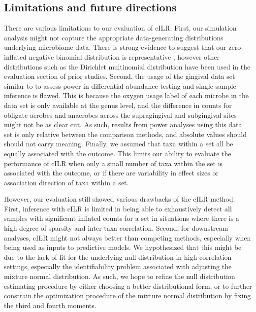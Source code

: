 \documentclass[10pt,letterpaper]{article}
\begin{document}
\subsection*{Limitations and future directions} 
There are various limitations to our evaluation of cILR. First, our simulation analysis might not capture the appropriate data-generating distributions underlying microbiome data. There is strong evidence to suggest that our zero-inflated negative binomial distribution is representative \cite{calgaro2020}, however other distributions such as the Dirichlet multinomial distribution \cite{wu2016} have been used in the evaluation section of prior studies. Second, the usage of the gingival data set similar to \cite{calgaro2020} to assess power in differential abundance testing and single sample inference is flawed. This is because the oxygen usage label of each microbe in the data set is only available at the genus level, and the difference in counts for obligate aerobes and anaerobes across the supragingival and subgingival sites might not be as clear cut. As such, results from power analyses using this data set is only relative between the comparison methods, and absolute values should should not carry meaning. Finally, we assumed that taxa within a set all be equally associated with the outcome. This limits our ability to evaluate the performance of cILR when only a small number of taxa within the set is associated with the outcome, or if there are variability in effect sizes or association direction of taxa within a set. 

However, our evaluation still showed various drawbacks of the cILR method. First, inference with cILR is limited in being able to exhaustively detect all samples with significant inflated counts for a set in situations where there is a high degree of sparsity and inter-taxa correlation. Second, for downstream analyses, cILR might not always better than competing methods, especially when being used as inputs to predictive models. We hypothesized that this might be due to the lack of fit for the underlying null distribution in high correlation settings, especially the identifiability problem associated with adjusting the mixture normal distribution. As such, we hope to refine the null distribution estimating procedure by either choosing a better distributional form, or to further constrain the optimization procedure of the mixture normal distribution by fixing the third and fourth moments. 
\end{document}
